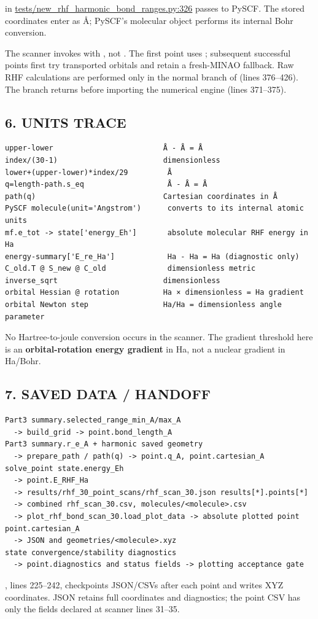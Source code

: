 \documentclass[10pt,a4paper]{article}
\begin{document}
 in \href{/Users/novaz/Desktop/qml2.0/tests/new\_rhf\_harmonic\_bond\_ranges.py:326}{tests/new\_rhf\_harmonic\_bond\_ranges.py:326} passes  to PySCF. The stored coordinates enter as Å; PySCF's molecular object performs its internal Bohr conversion.

The scanner invokes  with , not . The first point uses ; subsequent successful points first try transported orbitals and retain a fresh-MINAO fallback. Raw RHF calculations are performed only in the normal branch of  (lines 376–426). The  branch returns before importing the numerical engine (lines 371–375).

\subsection{6. UNITS TRACE}
\begin{Verbatim}
upper-lower                         Å - Å = Å
index/(30-1)                        dimensionless
lower+(upper-lower)*index/29         Å
q=length-path.s_eq                   Å - Å = Å
path(q)                             Cartesian coordinates in Å
PySCF molecule(unit='Angstrom')      converts to its internal atomic units
mf.e_tot -> state['energy_Eh']       absolute molecular RHF energy in Ha
energy-summary['E_re_Ha']            Ha - Ha = Ha (diagnostic only)
C_old.T @ S_new @ C_old              dimensionless metric
inverse_sqrt                        dimensionless
orbital Hessian @ rotation          Ha × dimensionless = Ha gradient
orbital Newton step                 Ha/Ha = dimensionless angle parameter
\end{Verbatim}
No Hartree-to-joule conversion occurs in the scanner. The  gradient threshold here is an \textbf{orbital-rotation energy gradient} in Ha, not a nuclear gradient in Ha/Bohr.

\subsection{7. SAVED DATA / HANDOFF}
\begin{Verbatim}
Part3 summary.selected_range_min_A/max_A
  -> build_grid -> point.bond_length_A
Part3 summary.r_e_A + harmonic saved geometry
  -> prepare_path / path(q) -> point.q_A, point.cartesian_A
solve_point state.energy_Eh
  -> point.E_RHF_Ha
  -> results/rhf_30_point_scans/rhf_scan_30.json results[*].points[*]
  -> combined rhf_scan_30.csv, molecules/<molecule>.csv
  -> plot_rhf_bond_scan_30.load_plot_data -> absolute plotted point
point.cartesian_A
  -> JSON and geometries/<molecule>.xyz
state convergence/stability diagnostics
  -> point.diagnostics and status fields -> plotting acceptance gate
\end{Verbatim}
, lines 225–242, checkpoints JSON/CSVs after each point and writes XYZ coordinates. JSON retains full coordinates and diagnostics; the point CSV has only the fields declared at scanner lines 31–35.
\end{document}

